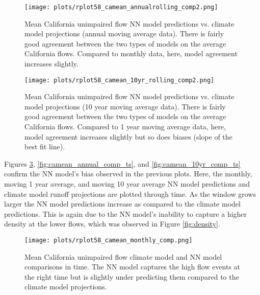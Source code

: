 \begin{figure}
	\centering
	\texttt{[image: plots/rplot58\_camean\_annualrolling\_comp2.png]}
	\caption[Mean California unimpaired flow NN model predictions vs. climate model projections (annual moving average data).]{Mean California unimpaired flow NN model predictions vs. climate model projections (annual moving average data). There is fairly good agreement between the two types of models on the average California flows. Compared to monthly data, here, model agreement increases slightly.} 
	\label{fig:camean_annual_comp}
\end{figure}

\begin{figure}
	\centering
	\texttt{[image: plots/rplot58\_camean\_10yr\_rolling\_comp2.png]}
	\caption[Mean California unimpaired flow NN model predictions vs. climate model projections (10 year moving average data).]{Mean California unimpaired flow NN model predictions vs. climate model projections (10 year moving average data). There is fairly good agreement between the two types of models on the average California flows. Compared to 1 year moving average data, here, model agreement increases slightly but so does biases (slope of the best fit line).} 
	\label{fig:camean_10yr_comp}
\end{figure}

Figures \ref{fig:camean_monthly_comp_ts}, \ref{fig:camean_annual_comp_ts}, and \ref{fig:camean_10yr_comp_ts} confirm the NN model's bias observed in the previous plots. Here, the monthly, moving 1 year average, and moving 10 year average NN model predictions and climate model runoff projections are plotted through time. As the window grows larger the NN model predictions increase as compared to the climate model predictions. This is again due to the NN model's inability to capture a higher density at the lower flows, which was observed in Figure \ref{fig:density}.

\begin{figure}
	\centering
	\texttt{[image: plots/rplot58\_camean\_monthly\_comp.png]}
	\caption[Mean California unimpaired flow climate model and NN model comparisons in time (monthly data).]{Mean California unimpaired flow climate model and NN model comparisons in time. The NN model captures the high flow events at the right time but is slightly under predicting them compared to the climate model projections.} 
	\label{fig:camean_monthly_comp_ts}
\end{figure}

